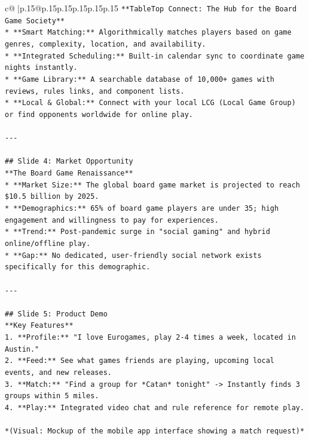 \documentclass{article}
\begin{document}
{\begin{supertabular}{c@{$\;$}|p{.15\linewidth}@{}p{.15\linewidth}p{.15\linewidth}p{.15\linewidth}p{.15\linewidth}p{.15\linewidth}}
{{{\texttt{**TableTop Connect: The Hub for the Board Game Society**} \\
\texttt{*   **Smart Matching:** Algorithmically matches players based on game genres, complexity, location, and availability.} \\
\texttt{*   **Integrated Scheduling:** Built{-}in calendar sync to coordinate game nights instantly.} \\
\texttt{*   **Game Library:** A searchable database of 10,000+ games with reviews, rules links, and component lists.} \\
\texttt{*   **Local \& Global:** Connect with your local LCG (Local Game Group) or find opponents worldwide for online play.} \\
\\ 
\texttt{{-}{-}{-}} \\
\\ 
\texttt{\#\# Slide 4: Market Opportunity} \\
\texttt{**The Board Game Renaissance**} \\
\texttt{*   **Market Size:** The global board game market is projected to reach \$10.5 billion by 2025.} \\
\texttt{*   **Demographics:** 65\% of board game players are under 35; high engagement and willingness to pay for experiences.} \\
\texttt{*   **Trend:** Post{-}pandemic surge in "social gaming" and hybrid online/offline play.} \\
\texttt{*   **Gap:** No dedicated, user{-}friendly social network exists specifically for this demographic.} \\
\\ 
\texttt{{-}{-}{-}} \\
\\ 
\texttt{\#\# Slide 5: Product Demo} \\
\texttt{**Key Features**} \\
\texttt{1.  **Profile:** "I love Eurogames, play 2{-}4 times a week, located in Austin."} \\
\texttt{2.  **Feed:** See what games friends are playing, upcoming local events, and new releases.} \\
\texttt{3.  **Match:** "Find a group for *Catan* tonight" {-}> Instantly finds 3 groups within 5 miles.} \\
\texttt{4.  **Play:** Integrated video chat and rule reference for remote play.} \\
\\ 
\texttt{*(Visual: Mockup of the mobile app interface showing a match request)*} \\
}}}
\end{supertabular}}
\end{document}
